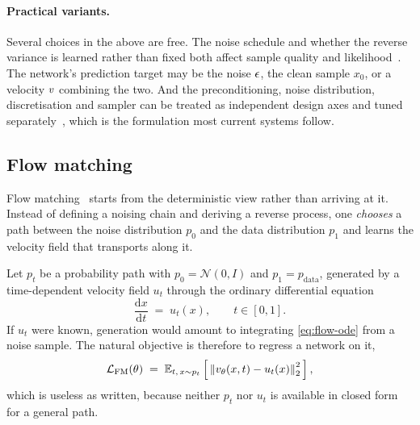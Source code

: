\paragraph{Practical variants.} Several choices in the above are free.
The noise schedule and whether the reverse variance is learned rather than
fixed both affect sample quality and likelihood~\citep{nichol2021iddpm}. The
network's prediction target may be the noise $\epsilon$, the clean sample
$x_0$, or a velocity $v$ combining the two. And the preconditioning,
noise distribution, discretisation and sampler can be treated as
independent design axes and tuned separately~\citep{karras2022edm}, which is
the formulation most current systems follow.

\subsection{Flow matching}
\label{sec:rw-flowmatching}

Flow matching~\citep{lipman2023flowmatching} starts from the deterministic
view rather than arriving at it. Instead of defining a noising chain and deriving a reverse process, one
\emph{chooses} a path between the noise distribution $p_0$ and the data
distribution $p_1$ and learns the velocity field that transports along it.

Let $p_t$ be a probability path with $p_0 = \mathcal{N}(0,I)$ and
$p_1 = p_{\text{data}}$, generated by a time-dependent velocity field
$u_t$ through the ordinary differential equation
\begin{equation}
  \label{eq:flow-ode}
  \frac{\mathrm{d}x}{\mathrm{d}t} \;=\; u_t(x), \qquad t \in [0,1].
\end{equation}
If $u_t$ were known, generation would amount to integrating
\cref{eq:flow-ode} from a noise sample. The natural objective is therefore
to regress a network on it,
\begin{equation}
  \label{eq:fm}
  \mathcal{L}_{\text{FM}}(\theta) \;=\; \mathbb{E}_{t,\,x \sim p_t}
  \left[\, \left\lVert v_\theta(x,t) - u_t(x) \right\rVert_2^2 \,\right],
\end{equation}
which is useless as written, because neither $p_t$ nor $u_t$ is available
in closed form for a general path.

